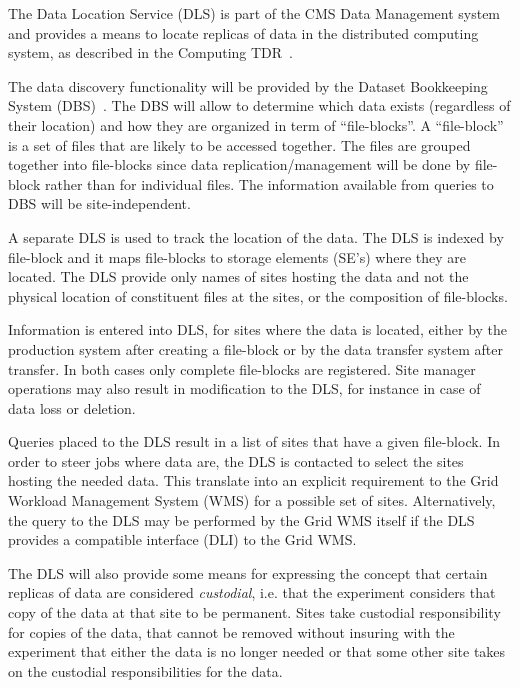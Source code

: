 \documentclass[pdftex]{cmspaper}
\begin{document}
The Data Location Service (DLS) is part of the CMS Data Management system
and provides a means to locate replicas of data in the distributed computing
system, as described in the Computing TDR~\cite{CTDR}.

The data discovery functionality will be provided by the 
Dataset Bookkeeping System (DBS)~\cite{DBS}.
The DBS will allow to determine which data exists (regardless
of their location) and how they are organized in 
term of ``file-blocks''.
A ``file-block'' is a set of files that are likely to be 
accessed together. The files are grouped together into file-blocks 
since data replication/management will be done by file-block rather than 
for individual files.
The information available from queries to DBS will be site-independent.

A separate DLS is used to track the location of the data.
The DLS is indexed by file-block and it maps file-blocks
to storage elements (SE's) where they are located.
The DLS provide only names of sites hosting the data and not the
physical location of constituent files at the sites, or the composition
of file-blocks.

Information is entered into DLS, for sites where the data is located, 
either by the production system after creating a file-block or by 
the data transfer system after transfer. In both cases only 
complete file-blocks are registered.
Site manager operations may also result in modification to
the DLS, for instance in case of data loss or deletion.

Queries placed to the DLS result in a list of sites that have
a given file-block. 
In order to steer jobs where data are, the DLS is contacted to 
select the sites hosting the needed data.
This translate into an explicit requirement to the Grid Workload 
Management System (WMS) for a possible set of sites. Alternatively, 
the query to the DLS may be performed by the Grid WMS itself if 
the DLS provides a compatible interface (DLI) to the Grid WMS. 


  The DLS will also provide some means for expressing the concept that
certain replicas of data are considered {\em custodial}, i.e. that the
experiment considers that copy of the data at that site to be permanent.
Sites take custodial responsibility for copies of the data, that cannot 
be removed without insuring with the experiment that either the data 
is no longer needed or that some other site takes on the custodial 
responsibilities for the data.
\end{document}
